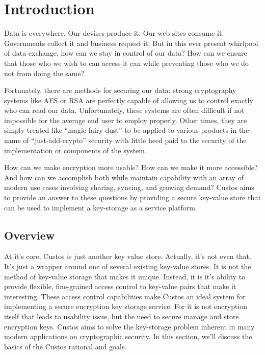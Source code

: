 \chapter{Introduction}
\label{chap:intro}

Data is everywhere. Our devises produce it. Our web sites consume
it. Governments collect it and business request it. But in this ever
present whirlpool of data exchange, how can we stay in control of our
data? How can we ensure that those who we wish to can access it can
while preventing those who we do not from doing the same?

Fortunately, there are methods for securing our data: strong
cryptography systems like AES or RSA are perfectly capable of allowing
us to control exactly who can read our data. Unfortunately, these
systems are often difficult if not impossible for the average end user
to employ properly. Other times, they are simply treated like ``magic
fairy dust'' to be applied to various products in the name of
``just-add-crypto'' security with little heed paid to the security of
the implementation or components of the system.

How can we make encryption more usable? How can we make it more
accessible? And how can we accomplish both while maintain capability
with an array of modern use cases involving sharing, syncing, and
growing demand? Custos aims to provide an answer to these questions by
providing a secure key-value store that can be used to implement a
key-storage as a service platform.

\section{Overview}

At it's core, Custos is just another key value store. Actually, it's
not even that. It's just a wrapper around one of several existing
key-value stores. It is not the method of key-value storage that makes
it unique. Instead, it is it's ability to provide flexible,
fine-grained access control to key-value pairs that make it
interesting. These access control capabilities make Custos an ideal
system for implementing a secure encryption key storage service. For
it is not encryption itself that leads to usability issue, but the
need to secure manage and store encryption keys. Custos aims to solve
the key-storage problem inherent in many modern applications on
cryptographic security. In this section, we'll discuss the basics of
the Custos rational and goals.

